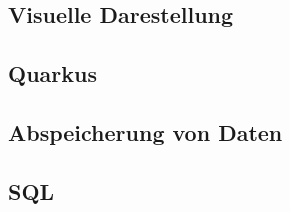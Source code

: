 \begin{spacing}{1}
    \section{Visuelle Darestellung}\label{section:gui}
    \end{spacing}


\begin{spacing}{1}
    \section{Quarkus}\label{section:quarkus}
    \end{spacing}


\begin{spacing}{1}
    \section{Abspeicherung von Daten}\label{section:savedata}
    \end{spacing}


\begin{spacing}{1}
    \section{SQL}\label{section:sql}
    \end{spacing}


